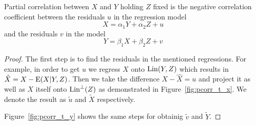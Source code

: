 \begin{theorem}
Partial correlation between $X$ and $Y$ holding $Z$ fixed is the negative
correlation coefficient between the residuals $u$ in the regression model
\[
X = \alpha_1 Y + \alpha_2 Z + u
\]
and the residuals $v$ in the model
\[
Y = \beta_1 X + \beta_2 Z + v
\]
\end{theorem}

\begin{proof}
The first step is to find the residuals in the mentioned regressions.
For example, in order to get $u$ we regress $X$ onto $\operatorname{Lin}(Y,Z)$
which results in $\hat X = X - \operatorname{E}(X \vert Y, Z)$.
Then we take the difference $X - \hat X = u$
and project it as well as $X$ itself onto $\operatorname{Lin}^{\perp}(Z)$ as demonstrated
in Figure~\ref{fig:pcorr_t_x}.
We denote the result as $\tilde u$ and $\widetilde X$ respectively.

Figure~\ref{fig:pcorr_t_y} shows the same steps for obtainig $\tilde v$ and $\widetilde Y$.


\end{proof}
